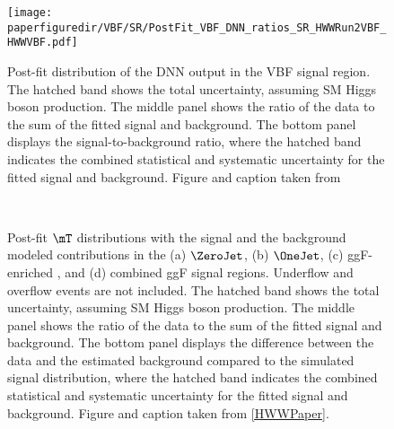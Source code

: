 \begin{figure}[htb]
  \centering
  \texttt{[image: \\paperfiguredir/VBF/SR/PostFit\_VBF\_DNN\_ratios\_SR\_HWWRun2VBF\_HWWVBF.pdf]}
  \caption{
    Post-fit distribution of the DNN output in the VBF signal region.
    The hatched band shows the total uncertainty, assuming SM Higgs boson production.
    The middle panel shows the ratio of the data to the sum of the fitted signal and background.
    The bottom panel displays the signal-to-background ratio, where the hatched band indicates the combined statistical and systematic uncertainty for the fitted signal and background.
    Figure and caption taken from 
  }
  \label{fig:VBF_DNN}
\end{figure}

\begin{figure}[htb]
  \centering
   \\
  \caption{
    Post-fit $\mT$ distributions with the signal and the background modeled contributions
    in the (a) $\ZeroJet$, (b) $\OneJet$, (c) ggF-enriched \TwoJet, and (d) combined ggF signal regions. Underflow and overflow events are not included.
    The hatched band shows the total uncertainty, assuming SM Higgs boson production.
    The middle panel shows the ratio of the data to the sum of the fitted signal and background.
    The bottom panel displays the difference between the data and the estimated background compared to the simulated signal distribution, where the hatched band indicates the combined statistical and systematic uncertainty for the fitted signal and background.
    Figure and caption taken from \cref{HWWPaper}. 
    \label{fig:ggF_MT}
  }
\end{figure}

